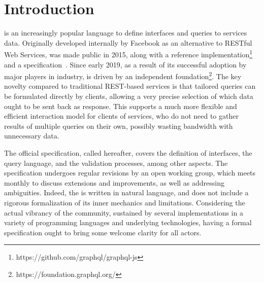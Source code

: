 \section{Introduction}

\gql is an increasingly popular language to define interfaces and queries to services data. Originally developed internally by Facebook as an alternative to RESTful Web Services, \gql was made public in 2015, along with a reference implementation\footnote{https://github.com/graphql/graphql-js} and a specification~\cite{gqlspec}. Since early 2019, as a result of its successful adoption by major players in industry,
\gql is driven by an independent foundation\footnote{https://foundation.graphql.org/}. The key novelty compared to traditional REST-based services is that tailored queries can be formulated directly by clients, allowing a very precise selection of which data ought to be sent back as response. This supports a much more flexible and efficient interaction model for clients of services, who do not need to gather results of multiple queries on their own, possibly wasting bandwidth with unnecessary data.


The official \gql specification, called \spec hereafter, 
covers the definition of interfaces, the query language, and the validation processes, among other aspects. The specification undergoes regular revisions by an open working group, which meets monthly to discuss extensions and improvements, as well as addressing ambiguities. Indeed, the \spec is written in natural language, and does not include a rigorous formalization of  its inner mechanics and limitations.
Considering the actual vibrancy of the \gql community, sustained by several implementations in a variety of programming languages and underlying technologies, having a formal specification ought to bring some welcome clarity for all actors.

